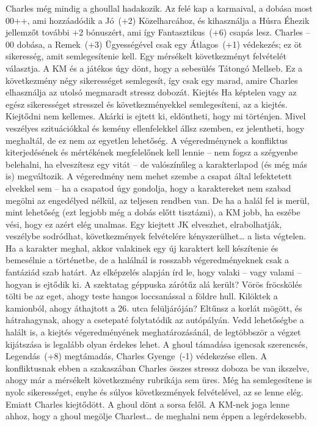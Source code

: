 \documentclass[oneside]{book}
\begin{document}
Charles még mindig a ghoullal hadakozik. Az felé kap a karmaival, a dobása most 00++, ami hozzáadódik a Jó~(+2) Közelharcához, és kihasználja a Húsra Éhezik jellemzőt további +2 bónuszért, ami így Fantasztikus~(+6) csapás lesz. Charles --00 dobása, a Remek~(+3) Ügyességével csak egy Átlagos~(+1) védekezés; ez öt sikeresség, amit semlegesítenie kell. Egy mérsékelt következményt felvételét választja. A KM és a játékos úgy dönt, hogy a sebesülés Tátongó Mellseb. Ez a következmény négy sikerességet semlegesít, így csak egy marad, amire Charles elhasználja az utolsó megmaradt stressz dobozát.
Kiejtés
Ha képtelen vagy az egész sikerességet stresszel és következményekkel semlegesíteni, az a kiejtés.
Kiejtődni nem kellemes. Akárki is ejtett ki, eldöntheti, hogy mi történjen. Mivel veszélyes szituációkkal és kemény ellenfelekkel állsz szemben, ez jelentheti, hogy meghaltál, de ez nem az egyetlen lehetőség. A végeredménynek a konfliktus kiterjedésének és mértékének megfelelőnek kell lennie – nem fogsz a szégyenbe belehalni, ha elveszítesz egy vitát – de valószínűleg a karakterlapod (és még más is) megváltozik. A végeredmény nem mehet szembe a csapat által lefektetett elvekkel sem – ha a csapatod úgy gondolja, hogy a karaktereket nem szabad megölni az engedélyed nélkül, az teljesen rendben van.
De ha a halál fel is merül, mint lehetőség (ezt legjobb még a dobás előtt tisztázni), a KM jobb, ha eszébe vési, hogy ez azért elég unalmas. Egy kiejtett JK elveszhet, elrabolhatják, veszélybe sodródhat, következmények felvételére kényszerülhet… a lista végtelen. Ha a karakter meghal, akkor valakinek egy új karaktert kell készítenie és bemesélnie a történetbe, de a halálnál is rosszabb végeredményeknek csak a fantáziád szab határt.
Az elképzelés alapján írd le, hogy valaki – vagy valami – hogyan is ejtődik ki. A szektatag géppuska zárótűz alá került? Vörös fröcskölés tölti be az eget, ahogy teste hangos loccsanással a földre hull. Kilöktek a kamionból, ahogy áthajtott a 26. utca felüljáróján? Eltűnsz a korlát mögött, és hátrahagynak, ahogy a csetepaté folytatódik az autópályán. Vedd lehetőségbe a halált is, a kiejtés végeredményének meghatározásánál, de legtöbbször a végzet kijátszása is legalább olyan érdekes lehet.
A ghoul támadása igencsak szerencsés, Legendás~(+8) megtámadás, Charles Gyenge~(-1) védekezése ellen. A konfliktusnak ebben a szakaszában Charles összes stressz doboza be van ikszelve, ahogy már a mérsékelt következmény rubrikája sem üres. Még ha semlegesítene is nyolc sikerességet, enyhe és súlyos következmények felvételével, az se lenne elég. Emiatt Charles kiejtődött. A ghoul dönt a sorsa felől. A KM‑nek joga lenne ahhoz, hogy a ghoul megölje Charlest… de meghalni nem éppen a legérdekesebb.
\end{document}
